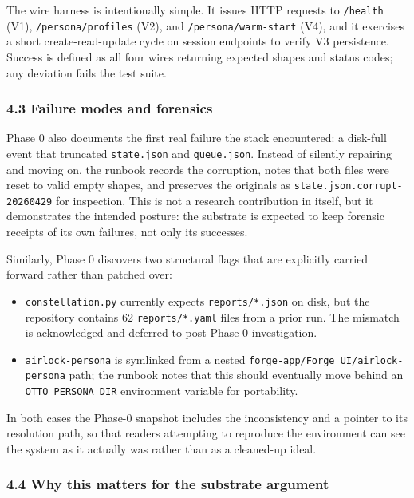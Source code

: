 The wire harness is intentionally simple. It issues HTTP requests to
\texttt{/health} (V1), \texttt{/persona/profiles} (V2), and
\texttt{/persona/warm-start} (V4), and it exercises a short
create-read-update cycle on session endpoints to verify V3 persistence.
Success is defined as all four wires returning expected shapes and
status codes; any deviation fails the test suite.

\subsubsection{4.3 Failure modes and
forensics}\label{failure-modes-and-forensics}

Phase 0 also documents the first real failure the stack encountered: a
disk-full event that truncated \texttt{state.json} and
\texttt{queue.json}. Instead of silently repairing and moving on, the
runbook records the corruption, notes that both files were reset to
valid empty shapes, and preserves the originals as
\texttt{state.json.corrupt-20260429} for inspection. This is not a
research contribution in itself, but it demonstrates the intended
posture: the substrate is expected to keep forensic receipts of its own
failures, not only its successes.

Similarly, Phase 0 discovers two structural flags that are explicitly
carried forward rather than patched over:

\begin{itemize}
\tightlist
\item
  \texttt{constellation.py} currently expects \texttt{reports/*.json} on
  disk, but the repository contains 62 \texttt{reports/*.yaml} files
  from a prior run. The mismatch is acknowledged and deferred to
  post-Phase-0 investigation.
\item
  \texttt{airlock-persona} is symlinked from a nested
  \texttt{forge-app/Forge\ UI/airlock-persona} path; the runbook notes
  that this should eventually move behind an \texttt{OTTO\_PERSONA\_DIR}
  environment variable for portability.
\end{itemize}

In both cases the Phase-0 snapshot includes the inconsistency and a
pointer to its resolution path, so that readers attempting to reproduce
the environment can see the system as it actually was rather than as a
cleaned-up ideal.

\subsubsection{4.4 Why this matters for the substrate
argument}\label{why-this-matters-for-the-substrate-argument}

